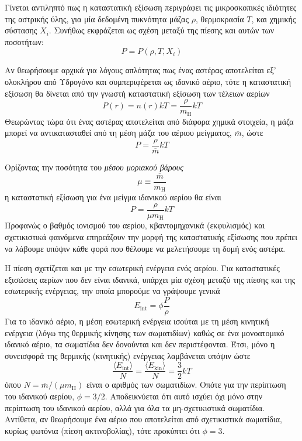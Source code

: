 Γίνεται αντιληπτό πως η καταστατική εξίσωση περιγράφει τις μικροσκοπικές ιδιότητες της αστρικής ύλης, για μία δεδομένη πυκνότητα μάζας $\rho$, θερμοκρασία $T$, και χημικής σύστασης $X_i$. Συνήθως εκφράζεται ως σχέση μεταξύ της πίεσης και αυτών των ποσοτήτων:
\begin{equation}
    P = P(\rho, T, X_i)
\end{equation}

Αν θεωρήσουμε αρχικά για λόγους απλότητας πως ένας αστέρας αποτελείται εξ' ολοκλήρου από Υδρογόνο και συμπεριφέρεται ως ιδανικό αέριο, τότε η καταστατική εξίσωση θα δίνεται από την γνωστή καταστατική εξίσωση των τέλειων αερίων 
\begin{equation}
    P(r) = n(r) kT = \frac{\rho}{m_\text{H}} kT
\end{equation}
Θεωρώντας τώρα ότι ένας αστέρας αποτελείται από διάφορα χημικά στοιχεία, η μάζα μπορεί να αντικατασταθεί από τη μέση μάζα του αέριου μείγματος, $\overline{m}$, ώστε
\begin{equation}
    P = \frac{\rho}{\overline{m}} kT
\end{equation}

Ορίζοντας την ποσότητα του \textit{μέσου μοριακού βάρους}
\begin{equation}
    \mu \equiv \frac{\overline{m}}{m_{\text{H}}}
\end{equation}
η καταστατική εξίσωση για ένα μείγμα ιδανικού αερίου θα είναι
\begin{equation}
    \label{eq:ideal_gas_eos}
    \boxed{P = \frac{\rho}{\mu m_{\text{H}}} k T }
\end{equation}
Προφανώς ο βαθμός ιονισμού του αερίου, κβαντομηχανικά (εκφυλισμός) και σχετικιστικά φαινόμενα επηρεάζουν την μορφή της καταστατικής εξίσωσης που πρέπει να λάβουμε υπόψιν κάθε φορά που θέλουμε να μελετήσουμε τη δομή ενός αστέρα. 

Η πίεση σχετίζεται και με την εσωτερική ενέργεια ενός αερίου. Για καταστατικές εξισώσεις αερίων που δεν είναι ιδανικά, υπάρχει μία σχέση μεταξύ της πίεσης και της εσωτερικής ενέργειας, την οποία μπορούμε να γράψουμε γενικά
\begin{equation}
    \label{eq:generic_eos}
    E_{\text{int}} = \phi \frac{P}{\rho} 
\end{equation}
Για το ιδανικό αέριο, η μέση εσωτερική ενέργεια ισούται με τη μέση κινητική ενέργεια (λόγω της θερμικής κίνησης των σωματιδίων) καθώς σε ένα μονοατομικό ιδανικό αέριο, τα σωματίδια δεν δονούνται και δεν περιστέφονται. Έτσι, μόνο η συνεισφορά της θερμικής (κινητικής) ενέργειας λαμβάνεται υπόψιν ώστε
\begin{equation}
    \label{eq:internal_energy_ideal_gas}
    \frac{\langle  E_{\text{int}} \rangle}{N} = \frac{\langle  E_{\text{kin}} \rangle}{N} = \frac{3}{2}kT
\end{equation}
όπου $N=\overline{m}/(\mu m_{\text{H}})$ είναι ο αριθμός των σωματιδίων. Oπότε για την περίπτωση του ιδανικού αερίου, $\phi = 3/2$. Αποδεικνύεται ότι αυτό ισχύει όχι μόνο στην περίπτωση του ιδανικού αερίου, αλλά για όλα τα μη-σχετικιστικά σωματίδια. Αντίθετα, αν θεωρήσουμε ένα αέριο που αποτελείται από σχετικιστικά σωματίδια, κυρίως φωτόνια (πίεση ακτινοβολίας), τότε προκύπτει ότι $\phi = 3$.

